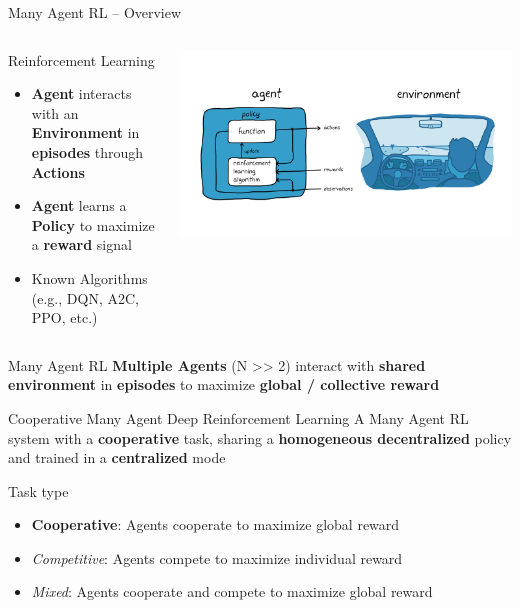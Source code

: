 \documentclass[presentation, 9pt]{beamer}\mode<presentation>{\usetheme{AMSBolognaFC}}
\begin{document}
\begin{frame}[allowframebreaks]{Many Agent RL -- Overview}
\begin{columns}
\begin{column}{0.55\textwidth}
	\begin{exampleblock}{Reinforcement Learning}
		\begin{itemize}
			\item \textbf{Agent} interacts with an \textbf{Environment} in \textbf{episodes} through \textbf{Actions}
			\item \textbf{Agent} learns a \textbf{Policy} to maximize  a \textbf{reward} signal 
			\item Known Algorithms (e.g., DQN, A2C, PPO, etc.)
		\end{itemize}
	\end{exampleblock}
\end{column}
\begin{column}{0.45\textwidth}
\includegraphics[width=\textwidth]{img/simple-rl.png}
\end{column}
\end{columns}

\centering
\begin{alertblock}{Many Agent RL}
\textbf{Multiple Agents} (N >> 2) interact with \textbf{shared environment} in \textbf{episodes} to maximize \textbf{global / collective reward} 
\end{alertblock}

\begin{alertblock}{Cooperative Many Agent Deep Reinforcement Learning}
   A Many Agent RL system with a \textbf{cooperative} task, sharing a \textbf{homogeneous decentralized} policy and trained in a \textbf{centralized} mode 
\end{alertblock}
\begin{exampleblock}{Task type}
	\begin{itemize}
		\item \textbf{Cooperative}: Agents cooperate to maximize global reward
		\item \emph{Competitive}: Agents compete to maximize individual reward
		\item \emph{Mixed}: Agents cooperate and compete to maximize global reward
	\end{itemize}
\end{exampleblock}


\end{frame}
\end{document}

